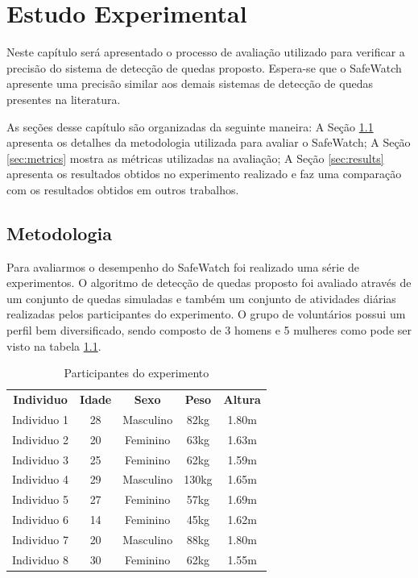 \chapter{Estudo Experimental}
\label{cap:avaliacao}

Neste capítulo será apresentado o processo de avaliação utilizado para verificar a precisão do sistema de detecção de quedas proposto. Espera-se que o SafeWatch apresente uma precisão similar aos demais sistemas de detecção de quedas presentes na literatura.

As seções desse capítulo são organizadas da seguinte maneira: A Seção \ref{sec:metodology} apresenta os detalhes da metodologia utilizada para avaliar o SafeWatch; A Seção \ref{sec:metrics} mostra as métricas utilizadas na avaliação; A Seção \ref{sec:results} apresenta os resultados obtidos no experimento realizado e faz uma comparação com os resultados obtidos em outros trabalhos.



\section{Metodologia}
\label{sec:metodology}

Para avaliarmos o desempenho do SafeWatch foi realizado uma série de experimentos. O algoritmo de detecção de quedas proposto foi avaliado através de um conjunto de quedas simuladas e também um conjunto de atividades diárias realizadas pelos participantes do experimento. O grupo de voluntários possui um perfil bem diversificado, sendo composto de 3 homens e 5 mulheres como pode ser visto na tabela \ref{tab:experiment}.


\begin{table}[h]
	\centering
	\caption{Participantes do experimento}
	\label{tab:experiment}
	\begin{tabular}{c|c|c|c|c}
		\hline
		\textbf{Individuo}  & \textbf{Idade} 	& \textbf{Sexo}   &    \textbf{Peso}    & \textbf{Altura} 	 \\
		Individuo 1         &    28          & Masculino            & 82kg      		& 1.80m          \\  
		Individuo 2         &    20          & Feminino             & 63kg      		& 1.63m          \\
		Individuo 3         &    25          & Feminino             & 62kg      		& 1.59m          \\ 
		Individuo 4         &    29          & Masculino            & 130kg      		& 1.65m          \\ 
		Individuo 5         &    27          & Feminino             & 57kg      		& 1.69m          \\ 
		Individuo 6         &    14          & Feminino             & 45kg      		& 1.62m          \\
		Individuo 7         &    20          & Masculino            & 88kg      		& 1.80m          \\ 
		Individuo 8         &    30          & Feminino             & 62kg      		& 1.55m          \\   
	\end{tabular}
\end{table}


